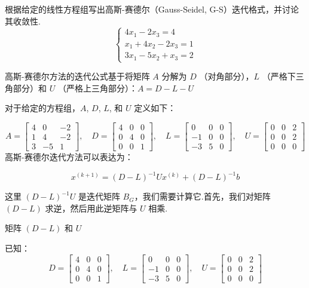\begin{tcolorbox}[enhanced,colback=10,colframe=9,breakable,coltitle=green!25!black,title=2024]

根据给定的线性方程组写出高斯-赛德尔（Gauss-Seidel, G-S）迭代格式，并讨论其收敛性.
$$
\begin{cases}
4x_1 - 2x_3 = 4 \\
x_1 + 4x_2 - 2x_3 = 1 \\
3x_1 - 5x_2 + x_3 = 2
\end{cases}
$$

\tcblower

高斯-赛德尔方法的迭代公式基于将矩阵 $A$ 分解为 $D$ （对角部分），$L$ （严格下三角部分）和 $U$ （严格上三角部分）：$A = D - L - U$

对于给定的方程组，$A$, $D$, $L$, 和 $U$ 定义如下：

$$
A = \begin{bmatrix}
4 & 0 & -2 \\
1 & 4 & -2 \\
3 & -5 & 1
\end{bmatrix}, \quad
D = \begin{bmatrix}
4 & 0 & 0 \\
0 & 4 & 0 \\
0 & 0 & 1
\end{bmatrix}, \quad
L = \begin{bmatrix}
0 & 0 & 0 \\
-1 & 0 & 0 \\
-3 & 5 & 0
\end{bmatrix}, \quad
U = \begin{bmatrix}
0 & 0 & 2 \\
0 & 0 & 2 \\
0 & 0 & 0
\end{bmatrix}
$$
高斯-赛德尔迭代方法可以表达为：

$$
x^{(k+1)} =   (D - L)^{-1} U x^{(k)}+(D - L)^{-1} b
$$

这里 $(D-L)^{-1} U$ 是迭代矩阵 $B_{G}$，我们需要计算它.首先，我们对矩阵 $(D-L)$ 求逆，然后用此逆矩阵与 $U$ 相乘.

 矩阵 $(D-L)$ 和 $U$

已知：
$$
D = \begin{bmatrix}
4 & 0 & 0 \\
0 & 4 & 0 \\
0 & 0 & 1
\end{bmatrix}, \quad
L = \begin{bmatrix}
0 & 0 & 0 \\
-1 & 0 & 0 \\
-3 & 5 & 0
\end{bmatrix}, \quad
U = \begin{bmatrix}
0 & 0 & 2 \\
0 & 0 & 2 \\
0 & 0 & 0
\end{bmatrix}
$$


\end{tcolorbox}
